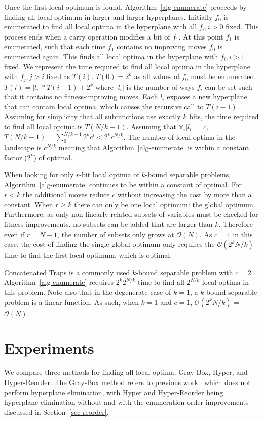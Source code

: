 \documentclass[runningheads,a4paper]{llncs}
\newcommand{\BigO}[1]{$\mathcal{O}{(#1)}$}
\begin{document}
Once the first local optimum is found, Algorithm~\ref{alg-enumerate} proceeds
by finding all local optimum in larger and larger hyperplanes. Initially $f_0$
is enumerated to find all local optima in the hyperplane with all $f_i, i>0$
fixed. This process ends when a carry operation modifies a bit of $f_1$. At
this point $f_1$ is enumerated, such that each time $f_1$ contains no improving moves
$f_0$ is enumerated again. This finds all local optima in the hyperplane with $f_i, i>1$
fixed. We represent the time required to find all local optima in the hyperplane
with $f_j, j>i$ fixed as $T(i)$. $T(0)=2^k$ as all values of $f_0$ must be enumerated.
$T(i) = |l_i|*T(i-1)+2^k$ where $|l_i|$ is the number of ways $f_i$ can be set such
that it contains no fitness-improving moves. Each $l_i$ exposes a new hyperplane
that can contain local optima, which causes the recursive call to $T(i-1)$.
Assuming for simplicity that all subfunctions use exactly $k$ bits,
the time required to find all local optima is $T(N/k-1)$.
Assuming that $\forall_i |l_i|=c$, $T(N/k-1)=\sum_0^{N/k-1}2^kc^i<2^kc^{N/k}$.
The number of local optima in the landscape is $c^{N/k}$ meaning that Algorithm~\ref{alg-enumerate}
is within a constant factor ($2^k$) of optimal.

When looking for only $r$-bit local optima of $k$-bound separable problems,
Algorithm~\ref{alg-enumerate} continues to be within a constant of optimal.
For $r < k$ the additional moves reduce $c$ without increasing the cost
by more than a constant.
When $r \geq k$ there can only be one local optimum: the global optimum. Furthermore, as
only non-linearly related subsets of variables must be checked
for fitness improvements, no subsets can be added that are larger than $k$.
Therefore even if $r=N-1$, the number of subsets only grows at \BigO{N}.
As $c=1$ in this case, the cost of finding the single global optimum
only requires the \BigO{2^kN/k} time to find the first local optimum, which is
optimal.

Concatenated Traps is a commonly used $k$-bound separable problem
with $c=2$.  Algorithm~\ref{alg-enumerate} requires $2^k2^{N/k}$ time
to find all $2^{N/k}$ local optima in this problem. Note also that
in the degenerate case of $k=1$, a $k$-bound separable problem
is a linear function. As such, when $k=1$ and $c=1$,
\BigO{2^kN/k} = \BigO{N}.

\section{Experiments}
We compare three methods for finding all local optima: Gray-Box, Hyper, and Hyper-Reorder.
The Gray-Box method refers to previous work~\cite{ochoa:2015:crossovernetworks} which does
not perform hyperplane elimination, with Hyper and Hyper-Reorder being hyperplane elimination
without and with the enumeration order improvements discussed in Section~\ref{sec-reorder}.
\end{document}
